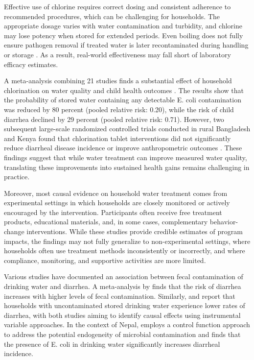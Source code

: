 \documentclass [11pt]{article}
\theoremstyle{plain}
\theoremstyle{definition}
\theoremstyle{remark}
\newcommand{\1}{\bm{1}}
\begin{document}
Effective use of chlorine requires correct dosing and consistent adherence to recommended procedures, which can be challenging for households. The appropriate dosage varies with water contamination and turbidity, and chlorine may lose potency when stored for extended periods. Even boiling does not fully ensure pathogen removal if treated water is later recontaminated during handling or storage \citep{wright2004household, clasen2008microbiological}. As a result, real-world effectiveness may fall short of laboratory efficacy estimates.

A meta-analysis combining 21 studies finds a substantial effect of household chlorination on water quality and child health outcomes \citep{arnold2007treating}. The results show that the probability of stored water containing any detectable E. coli contamination was reduced by 80 percent (pooled relative risk: 0.20), while the risk of child diarrhea declined by 29 percent (pooled relative risk: 0.71). However, two subsequent large-scale randomized controlled trials conducted in rural Bangladesh and Kenya found that chlorination tablet interventions did not significantly reduce diarrheal disease incidence or improve anthropometric outcomes \citep{pickering2019wash, luby2018effects}. These findings suggest that while water treatment can improve measured water quality, translating these improvements into sustained health gains remains challenging in practice.

Moreover, most causal evidence on household water treatment comes from experimental settings in which households are closely monitored or actively encouraged by the intervention. Participants often receive free treatment products, educational materials, and, in some cases, complementary behavior-change interventions. While these studies provide credible estimates of program impacts, the findings may not fully generalize to non-experimental settings, where households often use treatment methods inconsistently or incorrectly, and where compliance, monitoring, and supportive activities are more limited.

Various studies have documented an association between fecal contamination of drinking water and diarrhea. A meta-analysis by \cite{goddard2020faecal} finds that the risk of diarrhea increases with higher levels of fecal contamination. Similarly, \cite{usman2019impact} and \cite{hanif2024benefit} report that households with uncontaminated stored drinking water experience lower rates of diarrhea, with both studies aiming to identify causal effects using instrumental variable approaches. In the context of Nepal, \cite{rahman2021interconnection} employs a control function approach to address the potential endogeneity of microbial contamination and finds that the presence of E. coli in drinking water significantly increases diarrheal incidence.
\end{document}
